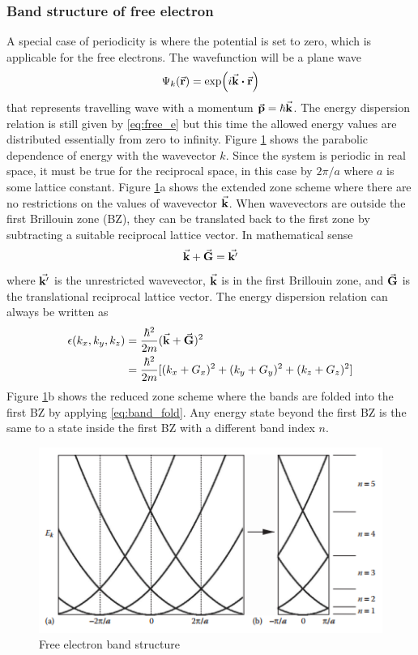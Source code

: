         \subsubsection{Band structure of free electron}
            A special case of periodicity is where the potential is set to zero, which is applicable for the free electrons. The wavefunction will be a plane wave 
            \begin{equation}
                \Psi_k(\va{r})  = \exp(i \va{k} \vdot \va{r})
            \end{equation} 
        that represents travelling wave with a momentum $\va{p} = \hbar \va{k}$. The energy dispersion relation is still given by \eqref{eq:free_e} but this time the allowed energy values are distributed essentially from zero to infinity. Figure \ref{fig:free-electron} shows the parabolic dependence of energy with the wavevector $k$. Since the system is periodic in real space, it must be true for the reciprocal space, in this case by $2\pi/a$ where $a$ is some lattice constant. Figure \ref{fig:free-electron}a shows the extended zone scheme where there are no restrictions on the values of wavevector $\va{k}$. When wavevectors are outside the first Brillouin zone (BZ), they can be translated back to the first zone by subtracting a suitable reciprocal lattice vector. In mathematical sense \citep{Kittel2004}
        \begin{equation} \label{eq:band_fold}
            \va{k} + \va{G} = \va{k'}
        \end{equation}
        where $\va{k'}$ is the unrestricted wavevector, $\va{k}$ is in the first Brillouin zone, and $\va{G}$ is the translational reciprocal lattice vector. The energy dispersion relation can always be written as 
        \begin{align}
            \epsilon(k_x,k_y,k_z) &= \frac{\hbar^2}{2m} (\va{k}+\va{G})^2 \notag \\
                                &= \frac{\hbar^2}{2m}[(k_x + G_x)^2 + (k_y + G_y)^2 + (k_z + G_z)^2]
        \end{align}
        Figure \ref{fig:free-electron}b shows the reduced zone scheme where the  bands are folded into the first BZ by applying \eqref{eq:band_fold}. Any energy state beyond the first BZ is the same to a state inside the first BZ with a different band index $n$.

 \begin{figure}[tbh!]
	\centering
	\includegraphics[width=0.7\linewidth]{"images/free electron"}
	\caption[Free electron band structure]{Free electron band structure}
	\label{fig:free-electron}
\end{figure}

